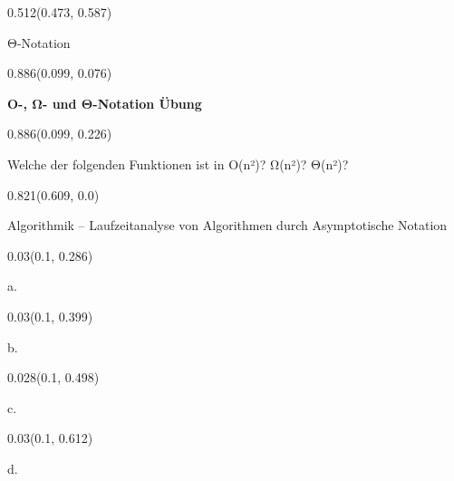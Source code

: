 \documentclass[aspectratio=169]{beamer}
\begin{document}
\begin{frame}[fragile]
\begin{textblock}{0.512}(0.473, 0.587)
  \begin{minipage}[t][0.064\paperheight]{\linewidth}
    {\tiny Θ-Notation}
  \end{minipage}
\end{textblock}
\begin{textblock}{0.886}(0.099, 0.076)
  \begin{minipage}[t][0.131\paperheight]{\linewidth}
    \textbf{O-, Ω- und Θ-Notation Übung}
  \end{minipage}
\end{textblock}
\begin{textblock}{0.886}(0.099, 0.226)
  \begin{minipage}[t][0.63\paperheight]{\linewidth}
    {\small Welche der folgenden Funktionen ist in O(n²)? Ω(n²)? Θ(n²)?}
  \end{minipage}
\end{textblock}
\begin{textblock}{0.821}(0.609, 0.0)
  \begin{minipage}[b][0.029\paperheight]{\linewidth}
    \raggedright
    \fontsize{3}{3.3}\selectfont Algorithmik – Laufzeitanalyse von Algorithmen durch Asymptotische Notation
  \end{minipage}
\end{textblock}
\begin{textblock}{0.03}(0.1, 0.286)
  \begin{minipage}[t][0.054\paperheight]{\linewidth}
    {\tiny a.}
  \end{minipage}
\end{textblock}
\begin{textblock}{0.03}(0.1, 0.399)
  \begin{minipage}[t][0.054\paperheight]{\linewidth}
    {\tiny b.}
  \end{minipage}
\end{textblock}
\begin{textblock}{0.028}(0.1, 0.498)
  \begin{minipage}[t][0.054\paperheight]{\linewidth}
    {\tiny c.}
  \end{minipage}
\end{textblock}
\begin{textblock}{0.03}(0.1, 0.612)
  \begin{minipage}[t][0.054\paperheight]{\linewidth}
    {\tiny d.}
  \end{minipage}

\end{textblock}
\end{frame}
\end{document}
